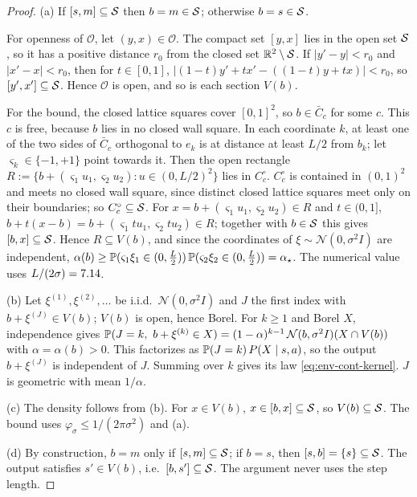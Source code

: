 \begin{proof}
(a) If $[s,m]\subseteq\cS$ then $b=m\in\cS$; otherwise $b=s\in\cS$.

For openness of $\mathcal O$, let $(y,x)\in\mathcal O$. The compact set $[y,x]$ lies in the open set $\cS$, so it has a positive distance $r_0$ from the closed set $\R^2\setminus\cS$.
If $\lvert y'-y\rvert<r_0$ and $\lvert x'-x\rvert<r_0$, then for $t\in[0,1]$, $\lvert(1-t)y'+tx'-((1-t)y+tx)\rvert<r_0$, so $[y',x']\subseteq\cS$.
Hence $\mathcal O$ is open, and so is each section $V(b)$.

For the bound, the closed lattice squares cover $[0,1]^2$, so $b\in\bar C_c$ for some $c$.
This $c$ is free, because $b$ lies in no closed wall square.
In each coordinate $k$, at least one of the two sides of $\bar C_c$ orthogonal to $e_k$ is at distance at least $L/2$ from $b_k$; let $\varsigma_k\in\{-1,+1\}$ point towards it.
Then the open rectangle $R:=\{b+(\varsigma_1u_1,\varsigma_2u_2):u\in(0,L/2)^2\}$ lies in $C^\circ_c$.
$C^\circ_c$ is contained in $(0,1)^2$ and meets no closed wall square, since distinct closed lattice squares meet only on their boundaries; so $C^\circ_c\subseteq\cS$.
For $x=b+(\varsigma_1u_1,\varsigma_2u_2)\in R$ and $t\in(0,1]$, $b+t(x-b)=b+(\varsigma_1tu_1,\varsigma_2tu_2)\in R$; together with $b\in\cS$ this gives $[b,x]\subseteq\cS$.
Hence $R\subseteq V(b)$, and since the coordinates of $\xi\sim\mathcal N(0,\sigma^2I)$ are independent,
$\alpha(b)\ge\Prob(\varsigma_1\xi_1\in(0,\tfrac L2))\,\Prob(\varsigma_2\xi_2\in(0,\tfrac L2))=\alpha_\star$.
The numerical value uses $L/(2\sigma)=\vn{const.L2sigma}{7.14}$.

(b) Let $\xi^{(1)},\xi^{(2)},\dots$ be i.i.d.\ $\mathcal N(0,\sigma^2I)$ and $J$ the first index with $b+\xi^{(J)}\in V(b)$; $V(b)$ is open, hence Borel.
For $k\ge1$ and Borel $X$, independence gives
$\Prob(J=k,\ b+\xi^{(k)}\in X)=(1-\alpha)^{k-1}\,\mathcal N(b,\sigma^2I)(X\cap V(b))$ with $\alpha=\alpha(b)>0$.
This factorizes as $\Prob(J=k)\,P(X\mid s,a)$, so the output $b+\xi^{(J)}$ is independent of $J$.
Summing over $k$ gives its law \eqref{eq:env-cont-kernel}. $J$ is geometric with mean $1/\alpha$.

(c) The density follows from (b). For $x\in V(b)$, $x\in[b,x]\subseteq\cS$, so $V(b)\subseteq\cS$. The bound uses $\varphi_\sigma\le1/(2\pi\sigma^2)$ and (a).

(d) By construction, $b=m$ only if $[s,m]\subseteq\cS$; if $b=s$, then $[s,b]=\{s\}\subseteq\cS$. The output satisfies $s'\in V(b)$, i.e.\ $[b,s']\subseteq\cS$. The argument never uses the step length.


\end{proof}
